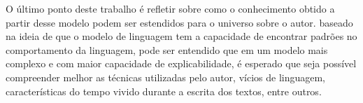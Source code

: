 \documentclass[9pt,technote]{IEEEtran}
\begin{document}
O último ponto deste trabalho é refletir sobre como o conhecimento obtido a partir desse modelo podem ser estendidos para o universo sobre o autor. baseado na ideia de que o modelo de linguagem tem a capacidade de encontrar padrões no comportamento da linguagem, pode ser entendido que em um modelo mais complexo e com maior capacidade de explicabilidade, é esperado que seja possível compreender melhor as técnicas utilizadas pelo autor, vícios de linguagem, características do tempo vivido durante a escrita dos textos, entre outros. 

\printbibliography
\end{document}
